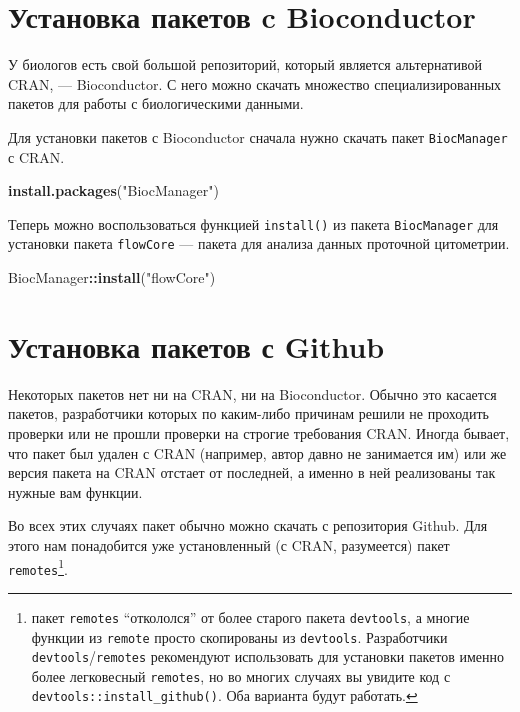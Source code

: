 \documentclass[]{book}
\newenvironment{Shaded}{\begin{snugshade}}{\end{snugshade}}
\newcommand{\KeywordTok}[1]{\textcolor[rgb]{0.13,0.29,0.53}{\textbf{#1}}}
\newcommand{\StringTok}[1]{\textcolor[rgb]{0.31,0.60,0.02}{#1}}
\newcommand{\OperatorTok}[1]{\textcolor[rgb]{0.81,0.36,0.00}{\textbf{#1}}}
\newcommand{\NormalTok}[1]{#1}
\begin{document}
\section{Установка пакетов c Bioconductor}\label{install_bioc}

У биологов есть свой большой репозиторий, который является альтернативой
CRAN, --- Bioconductor. С него можно скачать множество
специализированных пакетов для работы с биологическими данными.

Для установки пакетов с Bioconductor сначала нужно скачать пакет
\texttt{BiocManager} с CRAN.

\begin{Shaded}
\begin{Highlighting}[]
\KeywordTok{install.packages}\NormalTok{(}\StringTok{"BiocManager"}\NormalTok{)}
\end{Highlighting}
\end{Shaded}

Теперь можно воспользоваться функцией \texttt{install()} из пакета
\texttt{BiocManager} для установки пакета \texttt{flowCore} --- пакета
для анализа данных проточной цитометрии.

\begin{Shaded}
\begin{Highlighting}[]
\NormalTok{BiocManager}\OperatorTok{::}\KeywordTok{install}\NormalTok{(}\StringTok{"flowCore"}\NormalTok{)}
\end{Highlighting}
\end{Shaded}

\section{Установка пакетов с Github}\label{install_github}

Некоторых пакетов нет ни на CRAN, ни на Bioconductor. Обычно это
касается пакетов, разработчики которых по каким-либо причинам решили не
проходить проверки или не прошли проверки на строгие требования CRAN.
Иногда бывает, что пакет был удален с CRAN (например, автор давно не
занимается им) или же версия пакета на CRAN отстает от последней, а
именно в ней реализованы так нужные вам функции.

Во всех этих случаях пакет обычно можно скачать с репозитория Github.
Для этого нам понадобится уже установленный (с CRAN, разумеется) пакет
\texttt{remotes}\footnote{пакет \texttt{remotes} ``откололся'' от более
  старого пакета \texttt{devtools}, а многие функции из \texttt{remote}
  просто скопированы из \texttt{devtools}. Разработчики
  \texttt{devtools}/\texttt{remotes} рекомендуют использовать для
  установки пакетов именно более легковесный \texttt{remotes}, но во
  многих случаях вы увидите код с \texttt{devtools::install\_github()}.
  Оба варианта будут работать.}.
\end{document}
